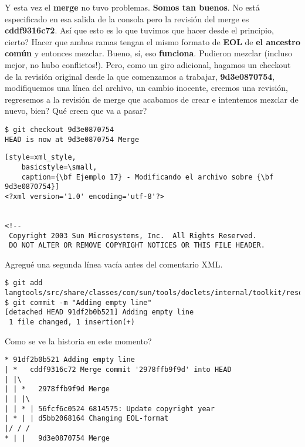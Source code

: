 Y esta vez el {\bf merge} no tuvo problemas. {\bf Somos tan buenos}. No está especificado en esa salida de la consola
pero la revisión del merge es {\bf cddf9316c72}. Así que esto es lo que tuvimos que hacer desde el principio, cierto?
Hacer que ambas ramas tengan el mismo formato de {\bf EOL} de {\bf el ancestro común} y entonces mezclar. Bueno, sí,
eso {\bf funciona}. Pudieron mezclar (incluso mejor, no hubo conflictos!). Pero, como un giro adicional, hagamos un checkout
de la revisión original desde la que comenzamos a trabajar, {\bf 9d3e0870754}, modifiquemos una línea del archivo, un cambio
inocente, creemos una revisión, regresemos a la revisión de merge que acabamos de crear e intentemos mezclar de nuevo, bien?
Qué creen que va a pasar?

\begin{lstlisting}[style=console_style,
	basicstyle=\small,
	caption={\bf Ejemplo 17} - saltando a una revisión antes de corregir el formato]
$ git checkout 9d3e0870754
HEAD is now at 9d3e0870754 Merge
\end{lstlisting}

\begin{lstlisting}[style=xml_style,
	basicstyle=\small,
	caption={\bf Ejemplo 17} - Modificando el archivo sobre {\bf 9d3e0870754}]
<?xml version='1.0' encoding='utf-8'?>


<!--
 Copyright 2003 Sun Microsystems, Inc.  All Rights Reserved.
 DO NOT ALTER OR REMOVE COPYRIGHT NOTICES OR THIS FILE HEADER.
\end{lstlisting}

Agregué una segunda línea vacía antes del comentario XML.

\begin{lstlisting}[style=console_style,
	basicstyle=\small,
	caption={\bf Ejemplo 17} - completando la revisión]
$ git add langtools/src/share/classes/com/sun/tools/doclets/internal/toolkit/resources/doclet.xml
$ git commit -m "Adding empty line"
[detached HEAD 91df2b0b521] Adding empty line
 1 file changed, 1 insertion(+)
\end{lstlisting}

Como se ve la historia en este momento?

\begin{lstlisting}[style=console_style,
	basicstyle=\small,
	caption={\bf Ejemplo 17} - historia actual]
* 91df2b0b521 Adding empty line
| *   cddf9316c72 Merge commit '2978ffb9f9d' into HEAD
| |\  
| | *   2978ffb9f9d Merge
| | |\  
| | * | 56fcf6c0524 6814575: Update copyright year
| * | | d5bb2068164 Changing EOL-format
|/ / /  
* | |   9d3e0870754 Merge
\end{lstlisting}

